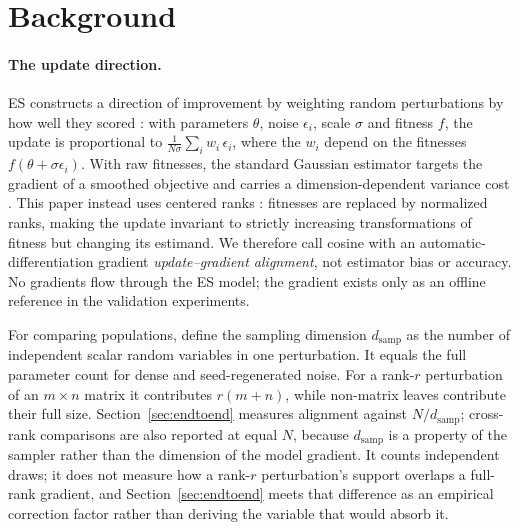 \section{Background}
\label{sec:background}

\paragraph{The update direction.} ES constructs a direction of improvement by weighting
random perturbations by how well they scored \citep{wierstra2014,nesterov2017}: with parameters $\theta$, noise
$\epsilon_i$, scale $\sigma$ and fitness $f$, the update is proportional to
$\frac{1}{N\sigma}\sum_i w_i\,\epsilon_i$, where the $w_i$ depend on the
fitnesses $f(\theta + \sigma\epsilon_i)$. With raw fitnesses, the standard
Gaussian estimator targets the gradient of a smoothed objective and carries a
dimension-dependent variance cost \citep{nesterov2017,duchi2015,berahas2022}.
This paper instead uses centered ranks \citep{salimans2017}: fitnesses are
replaced by normalized ranks, making the update invariant to strictly increasing
transformations of fitness but changing its estimand. We therefore call cosine
with an automatic-differentiation gradient \emph{update--gradient alignment},
not estimator bias or accuracy. No gradients flow through the ES model; the
gradient exists only as an offline reference in the validation experiments.

For comparing populations, define the sampling dimension $d_{\mathrm{samp}}$
as the number of independent scalar random variables in one perturbation. It
equals the full parameter count for dense and seed-regenerated noise. For a
rank-$r$ perturbation of an $m\times n$ matrix it contributes $r(m+n)$, while
non-matrix leaves contribute their full size. Section~\ref{sec:endtoend}
measures alignment against $N/d_{\mathrm{samp}}$; cross-rank comparisons are
also reported at equal $N$, because $d_{\mathrm{samp}}$ is a property of the
sampler rather than the dimension of the model gradient. It counts
independent draws; it does not measure how a rank-$r$ perturbation's support
overlaps a full-rank gradient, and Section~\ref{sec:endtoend} meets that
difference as an empirical correction factor rather than deriving the
variable that would absorb it.

